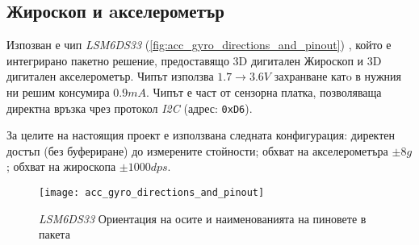 \subsection{Жироскоп и aкселерометър}
\FloatBarrier

Изпозван е чип \textit{LSM6DS33} (\autoref{fig:acc_gyro_directions_and_pinout}) \cite{accgyrorefman},
който е интегрирано пакетно решение, 
предоставящо 3D дигитален Жироскоп и 3D дигитален акселерометър.
Чипът използва \(1.7 \to 3.6V\) захранване катo в нужния ни решим консумира \(0.9mA\).
Чипът е част от сензорна платка, позволяваща директна връзка чрез протокол \textit{I2C} (адрес: \texttt{0xD6}).


За целите на настоящия проект е използвана следната конфигурация:
директен достъп (без буфериране) до измерените стойности;
обхват на акселерометъра \(\pm 8g\); обхват на жироскопа \(\pm 1000 dps\).


\begin{figure}[htpb!]
    \centering
    \texttt{[image: acc\_gyro\_directions\_and\_pinout]}
    \caption{\textit{LSM6DS33} Ориентация на осите и наименованията на пиновете в пакета}
    \label{fig:acc_gyro_directions_and_pinout}
\end{figure}

\FloatBarrier